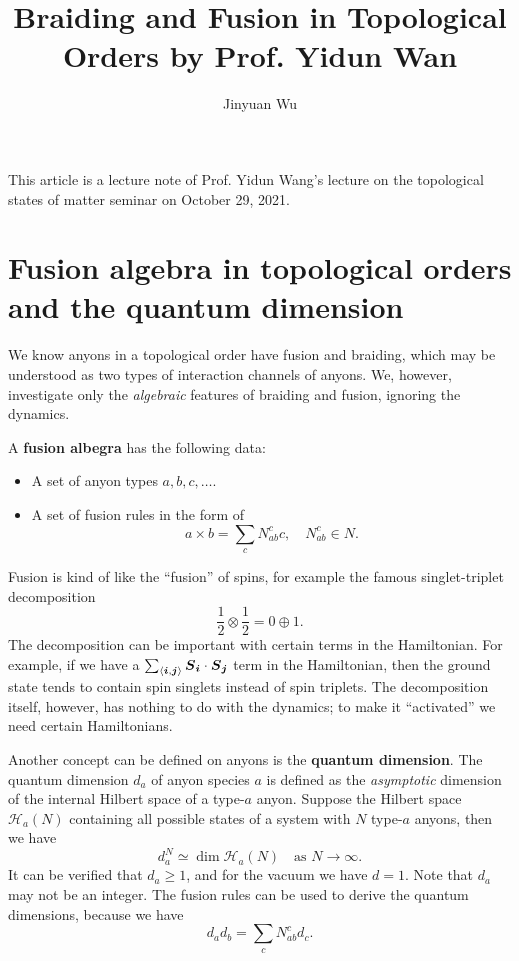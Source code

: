 \documentclass[hyperref, a4paper]{article}
\title{Braiding and Fusion in Topological Orders by Prof. Yidun Wan}
\author{Jinyuan Wu}
\newcommand*{\pair}[1]{\langle #1 \rangle}
\newcommand*{\concept}[1]{{\textbf{#1}}}
\def\mathbb#1{#1}%
\begin{document}
\maketitle

This article is a lecture note of Prof. Yidun Wang's lecture on the topological states of matter seminar on October 29, 2021.

\section{Fusion algebra in topological orders and the quantum dimension}

We know anyons in a topological order have fusion and braiding, which may be understood as two types of interaction channels of anyons.
We, however, investigate only the \emph{algebraic} features of braiding and fusion, ignoring the dynamics.

A \concept{fusion albegra} has the following data:
\begin{itemize}
    \item A set of anyon types $a, b, c, \ldots$.
    \item A set of fusion rules in the form of 
    \begin{equation}
        a \times b = \sum_c N^c_{ab} c, \quad N^c_{ab} \in \mathbb{N}.
    \end{equation}
\end{itemize}

Fusion is kind of like the ``fusion'' of spins, for example the famous singlet-triplet decomposition 
\[
    \frac{1}{2} \otimes \frac{1}{2} = 0 \oplus 1.
\]
The decomposition can be important with certain terms in the Hamiltonian. For example, if we have a $\sum_{\pair{\vb*{i}, \vb*{j}}} \vb*{S}_{\vb*{i}} \cdot \vb*{S}_{\vb*{j}}$ term in the Hamiltonian, then the ground state tends to contain spin singlets instead of spin triplets.
The decomposition itself, however, has nothing to do with the dynamics; to make it ``activated'' we need certain Hamiltonians. 

Another concept can be defined on anyons is the \concept{quantum dimension}.
The quantum dimension $d_a$ of anyon species $a$ is defined as the \emph{asymptotic} dimension of the internal Hilbert space of a type-$a$ anyon.
Suppose the Hilbert space $\mathcal{H}_{a}(N)$ containing all possible states of a system with $N$ type-$a$ anyons, then we have 
\begin{equation}
    d_a^N \simeq \dim \mathcal{H}_a(N) \quad \text{as $N \to \infty$}.
\end{equation}
It can be verified that $d_a \geq 1$, and for the vacuum we have $d = 1$. Note that $d_a$ may not be an integer.
The fusion rules can be used to derive the quantum dimensions, because we have 
\begin{equation}
    d_a d_b = \sum_c N_{ab}^c d_c.
\end{equation}
\end{document}

